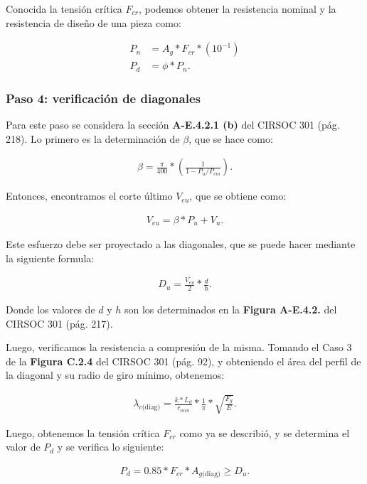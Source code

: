 \documentclass[../main.tex]{subfiles}
\begin{document}
Conocida la tensión crítica $F_{cr}$, podemos obtener la resistencia nominal y 
la resistencia de diseño de una pieza como:

\begin{align*}
  P_{n} &= A_g * F_{cr} * (10^{-1}) \\[5pt]
  P_{d} &= \phi * P_n
.\end{align*}

\subsubsection{Paso 4: verificación de diagonales}

Para este paso se considera la sección \textbf{A-E.4.2.1 (b)} del CIRSOC 301 
(pág. 218). Lo primero es la determinación de $\beta$, que se hace como:

\begin{align*}
  \beta = \frac{\pi}{400} * \left( \frac{1}{1-P_u / P_{cm}} \right) 
.\end{align*}

Entonces, encontramos el corte último $V_{eu}$, que se obtiene como:

\begin{align*}
  V_{eu} = \beta * P_u + V_u
.\end{align*}

Este esfuerzo debe ser proyectado a las diagonales, que se puede hacer mediante
la siguiente formula:

\begin{align*}
  D_u = \frac{V_{eu}}{2} * \frac{d}{h}
.\end{align*}

Donde los valores de $d$ y $h$ son los determinados en la 
\textbf{Figura A-E.4.2.} del CIRSOC 301 (pág. 217).

Luego, verificamos la resistencia a compresión de la misma. Tomando el Caso 3 de
la \textbf{Figura C.2.4} del CIRSOC 301 (pág. 92), y obteniendo el área del 
perfil de la diagonal y su radio de giro mínimo, obtenemos:

\begin{align*}
\lambda_{c\text{(diag)}} = \frac{k*L_d}{r_{min}} * \frac{1}{\pi} * \sqrt{\frac{F_y}{E}} 
.\end{align*}

Luego, obtenemos la tensión crítica $F_{cr}$ como ya se describió, y se determina
el valor de $P_d$ y se verifica lo siguiente:

\begin{align*}
  P_d = 0.85 * F_{cr} * A_{g \text{(diag)}} \geq D_u
.\end{align*}
\end{document}
